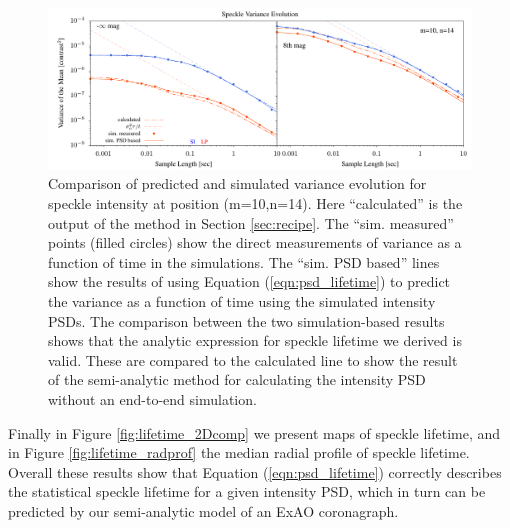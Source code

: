 \documentclass[10pt,preprint]{aastex631}
\begin{document}
\begin{figure}
\hspace{-0.3in}
\includegraphics[width=6.5in]{binVarComp_lp_10_14.pdf}
\caption{Comparison of predicted and simulated variance evolution for speckle intensity at position (m=10,n=14).  Here ``calculated'' is the output of the method in Section \ref{sec:recipe}.  The ``sim. measured'' points (filled circles) show the direct measurements of variance as a function of time in the simulations.  The ``sim. PSD based'' lines show the results of using Equation (\ref{eqn:psd_lifetime}) to predict the variance as a function of time using the simulated intensity PSDs.  The comparison between the two simulation-based results shows that the analytic expression for speckle lifetime we derived is valid.  These are compared to the calculated line to show the result of the semi-analytic method for calculating the intensity PSD without an end-to-end simulation.  \label{fig:binvarcomp}}
\end{figure}

Finally in Figure \ref{fig:lifetime_2Dcomp} we present maps of speckle lifetime, and in Figure \ref{fig:lifetime_radprof} the median radial profile of speckle lifetime.  Overall these results show that Equation (\ref{eqn:psd_lifetime}) correctly describes the statistical speckle lifetime for a given intensity PSD, which in turn can be predicted by our semi-analytic model of an ExAO coronagraph.
\end{document}

